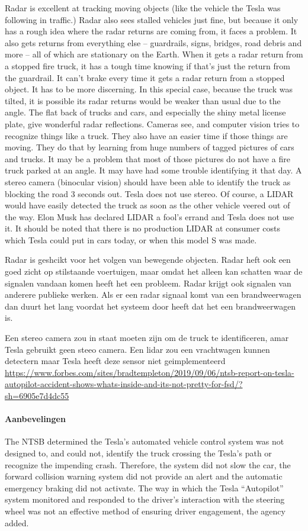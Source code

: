 \documentclass{article}
\begin{document}
Radar is excellent at tracking moving objects (like the vehicle the Tesla was following in traffic.)
Radar also sees stalled vehicles just fine, but because it only has a rough idea where the radar returns are coming from, it faces a problem. It also gets returns from everything else -- guardrails, signs, bridges, road debris and more -- all of which are stationary on the Earth. When it gets a radar return from a stopped fire truck, it has a tough time knowing if that's just the return from the guardrail. It can't brake every time it gets a radar return from a stopped object. It has to be more discerning.
In this special case, because the truck was tilted, it is possible its radar returns would be weaker than usual due to the angle. The flat back of trucks and cars, and especially the shiny metal license plate, give wonderful radar reflections.
Cameras see, and computer vision tries to recognize things like a truck. They also have an easier time if those things are moving. They do that by learning from huge numbers of tagged pictures of cars and trucks. It may be a problem that most of those pictures do not have a fire truck parked at an angle. It may have had some trouble identifying it that day.
A stereo camera (binocular vision) should have been able to identify the truck as blocking the road 3 seconds out. Tesla does not use stereo.
Of course, a LIDAR would have easily detected the truck as soon as the other vehicle veered out of the way. Elon Musk has declared LIDAR a fool's errand and Tesla does not use it. It should be noted that there is no production LIDAR at consumer costs which Tesla could put in cars today, or when this model S was made.

Radar is geshcikt voor het volgen van bewegende objecten.
Radar heft ook een goed zicht op stilstaande voertuigen, maar omdat het alleen kan schatten waar de signalen vandaan komen heeft het een probleem. Radar krijgt ook signalen van  anderere publieke werken.
Als er een radar signaal komt van een brandweerwagen dan duurt het lang voordat het systeem door heeft dat het een brandweerwagen is.

Een stereo camera zou in staat moeten zijn om de  truck te identificeren, amar Tesla gebruikt geen steeo camera.
Een lidar zou een vrachtwagen kunnen detectern maar Tesla heeft deze sensor niet geimplementeerd
\url{https://www.forbes.com/sites/bradtempleton/2019/09/06/ntsb-report-on-tesla-autopilot-accident-shows-whats-inside-and-its-not-pretty-for-fsd/?sh=6905e7d4dc55}

\paragraph{Aanbevelingen}
The NTSB determined the Tesla’s automated vehicle control system was not designed to, and could not, identify the truck crossing the Tesla’s path or recognize the impending crash. Therefore, the system did not slow the car, the forward collision warning system did not provide an alert and the automatic emergency braking did not activate.
The way in which the Tesla “Autopilot” system monitored and responded to the driver’s interaction with the steering wheel was not an effective method of ensuring driver engagement, the agency added.
\end{document}
